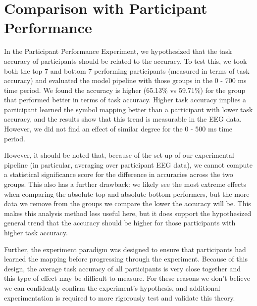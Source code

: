 \section{Comparison with Participant Performance}
In the Participant Performance Experiment, we hypothesized that the task 
accuracy of participants should be related to the \tvt accuracy. To test this, 
we took both the top 7 and bottom 7 performing participants (measured in terms 
of task accuracy) and evaluated the model pipeline with those groups in the 0 - 
700 ms time period.  We found the \tvt accuracy is higher (65.13\% vs 59.71\%) 
for the group that performed better in terms of task accuracy. Higher task 
accuracy implies a participant learned the symbol mapping better than a 
participant with lower task accuracy, and the \tvt results show that this trend 
is measurable in the EEG data.  However, we did not find an effect of similar 
degree for the 0 - 500 ms time period.

However, it should be noted that, because of the set up of our experimental 
pipeline (in particular, averaging over participant EEG data), we cannot 
compute a statistical significance score for the difference in \tvt accuracies 
across the two groups. This also has a further drawback: we likely see the most 
extreme effects when comparing the absolute top and absolute bottom performers, 
but the more data we remove from the groups we compare the lower the \tvt 
accuracy will be. This makes this analysis method less useful here, but it does 
support the hypothesized general trend that the \tvt accuracy should be higher 
for those participants with higher task accuracy.

Further, the experiment paradigm was designed to ensure that participants had 
learned the mapping before progressing through the experiment. Because of this 
design, the average task accuracy of all participants is very close together 
and this type of effect may be difficult to measure. For these reasons we don't 
believe we can confidently confirm the experiment's hypothesis, and additional 
experimentation is required to more rigorously test and validate this theory.
